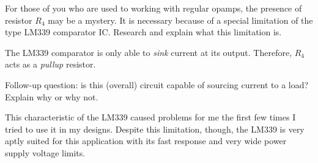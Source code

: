 

For those of you who are used to working with regular opamps, the presence of resistor $R_4$ may be a mystery.  It is necessary because of a special limitation of the type LM339 comparator IC.  Research and explain what this limitation is.







The LM339 comparator is only able to {\it sink} current at its output.  Therefore, $R_4$ acts as a {\it pullup} resistor.

\vskip 10pt

Follow-up question: is this (overall) circuit capable of sourcing current to a load?  Explain why or why not.







This characteristic of the LM339 caused problems for me the first few times I tried to use it in my designs.  Despite this limitation, though, the LM339 is very aptly suited for this application with its fast response and very wide power supply voltage limits.



